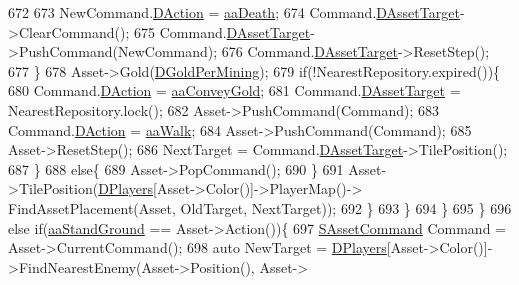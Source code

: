 \begin{DoxyCode}
672 
673                             NewCommand.\hyperlink{structSAssetCommand_a8edd3b3d59a76d5514ba403bc8076a75}{DAction} = \hyperlink{GameDataTypes_8h_ab47668e651a3032cfb9c40ea2d60d670a917cb474275eadda79115015ef00d5df}{aaDeath};
674                             Command.\hyperlink{structSAssetCommand_a3d9b43f6e59c386c48c41a65448a0c39}{DAssetTarget}->ClearCommand();
675                             Command.\hyperlink{structSAssetCommand_a3d9b43f6e59c386c48c41a65448a0c39}{DAssetTarget}->PushCommand(NewCommand);
676                             Command.\hyperlink{structSAssetCommand_a3d9b43f6e59c386c48c41a65448a0c39}{DAssetTarget}->ResetStep();
677                         \}
678                         Asset->Gold(\hyperlink{classCGameModel_a886529fe17365373d28c2881fdaa21f0}{DGoldPerMining});
679                         \textcolor{keywordflow}{if}(!NearestRepository.expired())\{
680                             Command.\hyperlink{structSAssetCommand_a8edd3b3d59a76d5514ba403bc8076a75}{DAction} = \hyperlink{GameDataTypes_8h_ab47668e651a3032cfb9c40ea2d60d670ae80ac4dde60023e0a1794e994db7000a}{aaConveyGold};
681                             Command.\hyperlink{structSAssetCommand_a3d9b43f6e59c386c48c41a65448a0c39}{DAssetTarget} = NearestRepository.lock();
682                             Asset->PushCommand(Command);
683                             Command.\hyperlink{structSAssetCommand_a8edd3b3d59a76d5514ba403bc8076a75}{DAction} = \hyperlink{GameDataTypes_8h_ab47668e651a3032cfb9c40ea2d60d670a60ca9010aa62b73c1aab838ff4bf7276}{aaWalk};
684                             Asset->PushCommand(Command);
685                             Asset->ResetStep();
686                             NextTarget = Command.\hyperlink{structSAssetCommand_a3d9b43f6e59c386c48c41a65448a0c39}{DAssetTarget}->TilePosition();
687                         \}
688                         \textcolor{keywordflow}{else}\{
689                             Asset->PopCommand();
690                         \}
691                         Asset->TilePosition(\hyperlink{classCGameModel_a524436c3560b10e1c6d6fdd0b66565dc}{DPlayers}[Asset->Color()]->PlayerMap()->
      FindAssetPlacement(Asset, OldTarget, NextTarget));
692                     \}
693                 \}
694             \}
695         \}
696         \textcolor{keywordflow}{else} \textcolor{keywordflow}{if}(\hyperlink{GameDataTypes_8h_ab47668e651a3032cfb9c40ea2d60d670abd8a4e07a8f888148ed62ddd46719af3}{aaStandGround} == Asset->Action())\{
697             \hyperlink{structSAssetCommand}{SAssetCommand} Command = Asset->CurrentCommand();
698             \textcolor{keyword}{auto} NewTarget = \hyperlink{classCGameModel_a524436c3560b10e1c6d6fdd0b66565dc}{DPlayers}[Asset->Color()]->FindNearestEnemy(Asset->Position(), Asset->

\end{DoxyCode}
